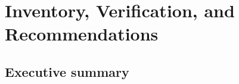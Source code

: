 %
%

\section{Inventory, Verification, and Recommendations}
\label{sec:tracka:inventory}

\subsection{Executive summary}
\label{sec:tracka:inventory:summary}

